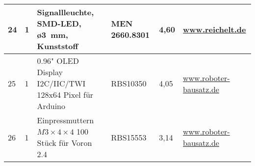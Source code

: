 \begin{center}
\begin{tabularx}{\textwidth}{|p{0.4cm}|p{0.4cm}|X|X|p{1cm}|X|}
		\hline
		24 & 1 & Signallleuchte, SMD-LED, ø3\ mm, Kunststoff & MEN 2660.8301 & 4,60 & \href{https://wwww.reichelt.de}{www.reichelt.de} \\
		\hline
		25 & 1 & 0.96" OLED Display I2C/IIC/TWI 128x64 Pixel für Arduino & RBS10350 & 4,05 & \href{https://www.roboter-bausatz.de/p/0.96-oled-display-i2c-iic-twi-128x64-pixel-fuer-arduino}{www.roboter-bausatz.de} \\
		\hline
		26 & 1 & Einpressmuttern $M3\times 4 \times 4$ 100 Stück für Voron 2.4 & RBS15553 & 3,14 & \href{https://www.roboter-bausatz.de/p/einpressmuttern-m3x4x4-100-stueck-fuer-voron-2.4}{www.roboter-bausatz.de} \\
		\hline
	\end{tabularx}
	
\end{center}